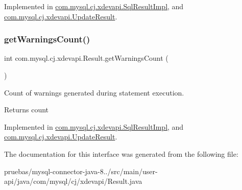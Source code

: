 Implemented in \mbox{\hyperlink{classcom_1_1mysql_1_1cj_1_1xdevapi_1_1_sql_result_impl_a58d7c6a9ad8d87b5447c2d2f5849ee73}{com.\+mysql.\+cj.\+xdevapi.\+Sql\+Result\+Impl}}, and \mbox{\hyperlink{classcom_1_1mysql_1_1cj_1_1xdevapi_1_1_update_result_a44b96bc6ac3193b0f276a8317d48b5b3}{com.\+mysql.\+cj.\+xdevapi.\+Update\+Result}}.

\mbox{\label{interfacecom_1_1mysql_1_1cj_1_1xdevapi_1_1_result_addd5c82af4ab35e702d7f2961119ecc6}} 
\subsubsection{\texorpdfstring{get\+Warnings\+Count()}{getWarningsCount()}}
{\footnotesize\ttfamily int com.\+mysql.\+cj.\+xdevapi.\+Result.\+get\+Warnings\+Count (\begin{DoxyParamCaption}{ }\end{DoxyParamCaption})}

Count of warnings generated during statement execution.

\begin{DoxyReturn}{Returns}
count 
\end{DoxyReturn}


Implemented in \mbox{\hyperlink{classcom_1_1mysql_1_1cj_1_1xdevapi_1_1_sql_result_impl_aec69633fd00fa0b998014ea8f94cc797}{com.\+mysql.\+cj.\+xdevapi.\+Sql\+Result\+Impl}}, and \mbox{\hyperlink{classcom_1_1mysql_1_1cj_1_1xdevapi_1_1_update_result_a5a4640f6081699843d69643728e1038b}{com.\+mysql.\+cj.\+xdevapi.\+Update\+Result}}.



The documentation for this interface was generated from the following file\+:\begin{DoxyCompactItemize}
\item 
pruebas/mysql-\/connector-\/java-\/8../src/main/user-\/api/java/com/mysql/cj/xdevapi/Result.\+java\end{DoxyCompactItemize}
